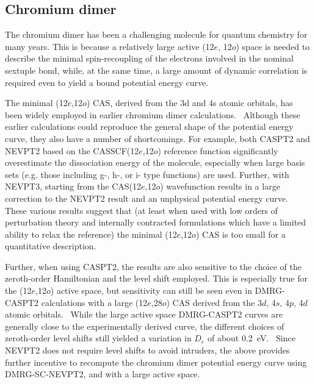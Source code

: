 \subsection{Chromium dimer}

The chromium dimer has been a challenging molecule for quantum chemistry for many years. This
is because a relatively large active (12$e$, 12$o$) space  is needed to 
describe the minimal spin-recoupling
of the electrons involved in the nominal sextuple bond, while, at the same time, a large amount of dynamic correlation is required 
even to yield a bound potential energy curve. \cite{andersson_cr2_1994,roos_multiconfigurational_1995,roos_multiconfigurational_1996,roos_ground_2003,angeli_third-order_2006,muller_large-scale_2009,kurashige_second-order_2011,sharma_multireference_2015}

The minimal (12$e$,12$o$) CAS, derived from the 3d and 4s atomic orbitals, has been  widely employed in earlier chromium dimer calculations.~\cite{andersson_cr2_1994, roos_multiconfigurational_1995, roos_multiconfigurational_1996, angeli_third-order_2006, muller_large-scale_2009, sharma_multireference_2015} Although these earlier calculations
could reproduce the general shape of the potential energy curve, they
also have a number of shortcomings.
For example, both CASPT2\cite{andersson_cr2_1994,roos_multiconfigurational_1995,roos_multiconfigurational_1996} and NEVPT2\cite{angeli_n-electron_2001} based on the CASSCF(12$e$,12$o$) reference function  significantly overestimate the 
dissociation energy of the molecule, especially when large basis sets (e.g. those including g-, h-, or i- type functions) are used.\cite{celani_cipt2_2004,angeli_third-order_2006} Further, with NEVPT3, \cite{angeli_third-order_2006} starting
from the CAS(12$e$,12$o$) wavefunction  results in a large correction to the NEVPT2 result 
and an unphysical potential energy curve. These various results suggest 
that (at least when used with low orders of perturbation
theory and internally contracted formulations which have a limited ability to relax the reference) the minimal (12$e$,12$o$) CAS is too small for a quantitative description.

Further, when using CASPT2, the results are also  sensitive to the choice of the zeroth-order Hamiltonian and
the level shift employed.\cite{celani_cipt2_2004,ruiperez_complete_2011} This is 
especially true for the (12$e$,12$o$) active space,
but sensitivity can still be seen even in  DMRG-CASPT2 calculations with a large (12$e$,28$o$) CAS derived from the 3$d$, 4$s$, 4$p$, 4$d$ atomic orbitals.~\cite{kurashige_second-order_2011}
While the large active space DMRG-CASPT2 curves are generally close to the experimentally derived
 curve, the different choices of zeroth-order level shifts 
still yielded a variation in $D_e$ 
of about 0.2~eV.~\cite{kurashige_second-order_2011} Since NEVPT2 does not require level shifts to avoid intruders, the above provides further incentive
to recompute the chromium dimer potential energy curve using DMRG-SC-NEVPT2,
and with a large active space.

